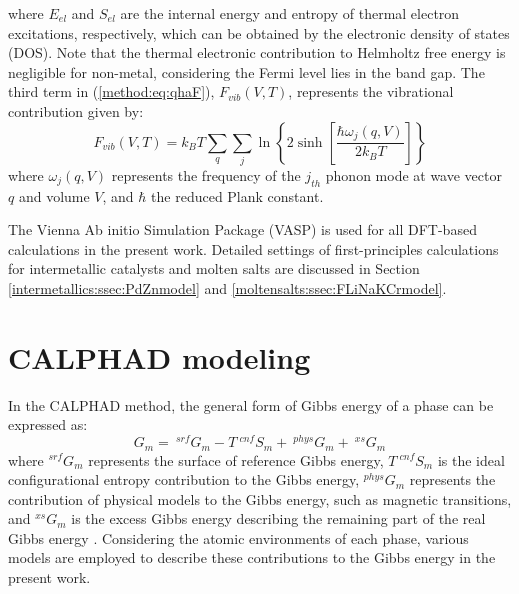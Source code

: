 where $E_{el}$ and $S_{el}$ are the internal energy and entropy of thermal electron excitations, respectively, which can be obtained by the electronic density of states (DOS). Note that the thermal electronic contribution to Helmholtz free energy is negligible for non-metal, considering the Fermi level lies in the band gap. The third term in (\ref{method:eq:qhaF}), $F_{vib}(V,T)$, represents the vibrational contribution \cite{wang2004thermodynamic, van2002effect} given by:
\begin{equation} \label{method:eq:Fvib}
    F_{vib}(V,T)=k_BT\sum_{q}\sum_{j}\ln{\left\{2\sinh{\left[\frac{\hbar\omega_j(q,V)}{2k_BT}\right]}\right\}}
\end{equation}
where $\omega_j\left(q,V\right)$ represents the frequency of the $j_{th}$ phonon mode at wave vector $q$ and volume $V$, and $\hbar$ the reduced Plank constant. 

The Vienna Ab initio Simulation Package (VASP) \cite{kresse1996efficient} is used for all DFT-based calculations in the present work. Detailed settings of first-principles calculations for intermetallic catalysts and molten salts are discussed in Section \ref{intermetallics:ssec:PdZnmodel} and \ref{moltensalts:ssec:FLiNaKCrmodel}.

\section{CALPHAD modeling} \label{method:sec:calphad}
In the CALPHAD method, the general form of Gibbs energy of a phase can be expressed as:
\begin{equation} \label{method:eq:Gm}
    G_m=\:^{srf}G_m-T\:^{cnf}S_m +\:^{phys}G_m +\:^{xs}G_m
\end{equation}
where $^{srf}G_m$ represents the surface of reference Gibbs energy, $T\:^{cnf}S_m$ is the ideal configurational entropy contribution to the Gibbs energy, $^{phys}G_m$ represents the contribution of physical models to the Gibbs energy, such as magnetic transitions, and $^{xs}G_m$ is the excess Gibbs energy describing the remaining part of the real Gibbs energy \cite{lukas2007computational}. Considering the atomic environments of each phase, various models are employed to describe these contributions to the Gibbs energy in the present work.

